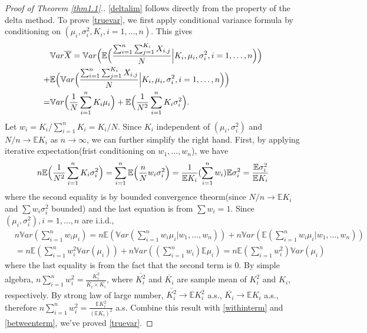 \documentclass[10pt]{article}
\newcommand{\var}{\ensuremath{\mathbb Var}}
\newcommand{\bbe}{\mathbb{E}}
\newcommand{\xbar}{\overline{X}}
\begin{document}
\begin{proof}[Proof of Theorem \ref{thm1.1}.]
\eqref{deltalim} follows directly from the property of the delta method. To prove \eqref{truevar}, we first apply conditional variance formula by conditioning on $(\mu_i,\sigma_i^2, K_i, i=1,\dots,n)$. This gives
\begin{align*}
&\var \xbar =  \var  \Bigl( \bbe\Bigl(   \frac{\sum_{i=1}^n\sum_{j=1}^{K_i} X_{i,j}}{N} \Big| K_i,\mu_i,\sigma_i^2,  i=1,\dots,n\Bigr) \Bigr) \\
+&\bbe \Bigl(\var \Bigl( \frac{\sum_{i=1}^n\sum_{j=1}^{K_i} X_{i,j}}{N} \Big | K_i,\mu_i,\sigma_i^2,  i=1,\dots,n\Bigr)\Bigr) \notag\\
=&\var \Bigl(\frac{1}{N}\sum_{i=1}^n K_i \mu_i \Bigr)+\bbe \Bigl(\frac{1}{N^2}\sum_{i=1}^n K_i \sigma^2_i \Bigr).
\end{align*}
Let  $w_i = K_i/\sum_{i=1}^n K_i = K_i/N$. Since $K_i$ independent of $(\mu_i, \sigma^2_i)$ and $N/n \to \bbe {K_i}$ as $n\to \infty$, we can further simplify the right hand. First, by applying iterative expectation(frist conditioning on $w_1,\dots, w_n$), we have  
\begin{align}
n \bbe \Bigl(\frac{1}{N^2}\sum_{i=1}^n K_i \sigma^2_i \Bigr)  = \sum_{i=1}^n \bbe\Bigl( \frac{n}{N} w_i\sigma^2_i \Bigr) = \frac{1}{\bbe K_i}(\sum_{i=1}^n w_i)\bbe \sigma_i^2 = \frac{\bbe \sigma_i^2}{\bbe K_i} \label{withinterm}
\end{align}
where the second equality is by bounded convergence theorm(since $N/n \to \bbe {K_i}$ and $\sum w_i\sigma^2_i$ bounded) and the last equation is from $\sum w_i=1$. Since $(\mu_i, \sigma^2_i), {i=1,\dots, n}$ are i.i.d., 
\begin{align}
&n\var (\sum_{i=1}^n w_i \mu_i) = n\bbe (\var (\sum_{i=1}^n w_i \mu_i|w_1,\dots,w_n))+ n\var (\bbe (\sum_{i=1}^n w_i \mu_i|w_1,\dots,w_n)) \\
&=  n\bbe (\sum_{i=1}^n w_i^2 \var(\mu_i)) + n \var((\sum_{i=1}^n w_i)\bbe\mu_i ) = n\bbe(\sum_{i=1}^n w_i^2) \var (\mu_i) \label {betweenterm}
\end{align}
where the last equality is from the fact that the second term is $0$. By simple algebra, 
$n \sum_{i=1}^n w_i^2 =  \frac{\overline{K_i^2}}{\overline{K_i} \times \overline{K_i}}$, where $\overline{K_i^2}$ and $\overline{K_i}$ are sample mean of $K_i^2$ and $K_i$, respectively.
By strong law of large number, $\overline{K_i^2}\to \bbe K_i^2$ a.s., $\overline{K_i}\to \bbe K_i$ a.s., therefore $n \sum_{i=1}^n w_i^2 =  \frac{\bbe{K_i^2}}{(\bbe{K_i})^2}$ a.s. Combine this result with \eqref{withinterm} and \eqref{betweenterm}, we've proved \eqref{truevar}.


\end{proof}
\end{document}
